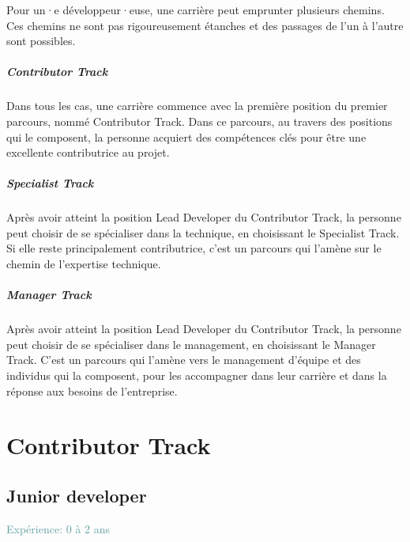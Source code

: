 \documentclass[a4paper, french, openany, 12pt]{book}
\newcommand\xp[1]{\textcolor{CadetBlue}{Expérience: {#1} ans}}
\newcommand\dev{développeur·euse}
\begin{document}
\begin{multicols}{2}
  Pour un·e \dev, une carrière peut emprunter plusieurs chemins.
  Ces chemins ne sont pas rigoureusement étanches et des passages de l'un à l'autre sont possibles.

  \subsubsection*{Contributor Track}

  Dans tous les cas, une carrière commence avec la première position du premier parcours, nommé Contributor Track.
  Dans ce parcours, au travers des positions qui le composent, la personne acquiert des compétences clés pour être une
  excellente contributrice au projet.

  \subsubsection*{Specialist Track}

  Après avoir atteint la position Lead Developer du Contributor Track, la personne peut choisir de se spécialiser 
  dans la technique, en choisissant le Specialist Track.
  Si elle reste principalement contributrice, c'est un parcours qui l'amène sur le chemin de l'expertise technique.

  \subsubsection*{Manager Track}

  Après avoir atteint la position Lead Developer du Contributor Track, la personne peut choisir de se spécialiser 
  dans le management, en choisissant le Manager Track.
  C'est un parcours qui l'amène vers le management d'équipe et des individus qui la composent, pour les
  accompagner dans leur carrière et dans la réponse aux besoins de l'entreprise.

\end{multicols}

\part{Contributor Track}

\chapter{Junior developer}

\xp{0 à 2}
\end{document}
